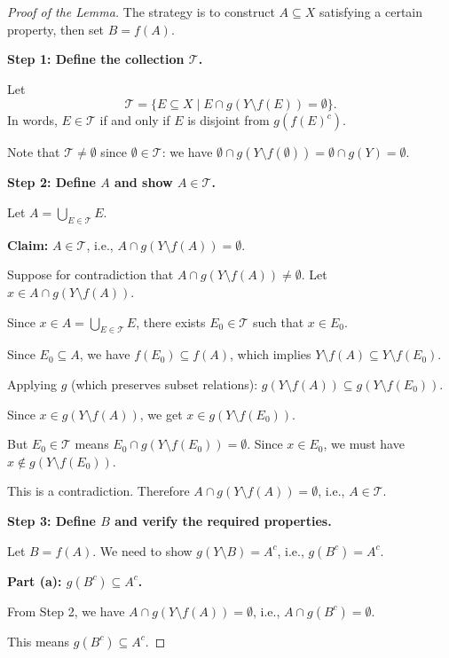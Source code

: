 \documentclass[11pt]{report}
\begin{document}
\begin{proof}[Proof of the Lemma]
The strategy is to construct $A \subseteq X$ satisfying a certain property, then set $B = f(A)$.

\textbf{Step 1: Define the collection $\mathcal{T}$.}

Let 
\[
\mathcal{T} = \{E \subseteq X \mid E \cap g(Y \setminus f(E)) = \emptyset\}.
\]
In words, $E \in \mathcal{T}$ if and only if $E$ is disjoint from $g(f(E)^c)$.

Note that $\mathcal{T} \neq \emptyset$ since $\emptyset \in \mathcal{T}$: we have $\emptyset \cap g(Y \setminus f(\emptyset)) = \emptyset \cap g(Y) = \emptyset$.

\textbf{Step 2: Define $A$ and show $A \in \mathcal{T}$.}

Let $A = \bigcup_{E \in \mathcal{T}} E$.

\textbf{Claim:} $A \in \mathcal{T}$, i.e., $A \cap g(Y \setminus f(A)) = \emptyset$.

Suppose for contradiction that $A \cap g(Y \setminus f(A)) \neq \emptyset$. Let $x \in A \cap g(Y \setminus f(A))$.

Since $x \in A = \bigcup_{E \in \mathcal{T}} E$, there exists $E_0 \in \mathcal{T}$ such that $x \in E_0$.

Since $E_0 \subseteq A$, we have $f(E_0) \subseteq f(A)$, which implies $Y \setminus f(A) \subseteq Y \setminus f(E_0)$.

Applying $g$ (which preserves subset relations): $g(Y \setminus f(A)) \subseteq g(Y \setminus f(E_0))$.

Since $x \in g(Y \setminus f(A))$, we get $x \in g(Y \setminus f(E_0))$.

But $E_0 \in \mathcal{T}$ means $E_0 \cap g(Y \setminus f(E_0)) = \emptyset$. Since $x \in E_0$, we must have $x \notin g(Y \setminus f(E_0))$.

This is a contradiction. Therefore $A \cap g(Y \setminus f(A)) = \emptyset$, i.e., $A \in \mathcal{T}$.

\textbf{Step 3: Define $B$ and verify the required properties.}

Let $B = f(A)$. We need to show $g(Y \setminus B) = A^c$, i.e., $g(B^c) = A^c$.

\textbf{Part (a): $g(B^c) \subseteq A^c$.}

From Step 2, we have $A \cap g(Y \setminus f(A)) = \emptyset$, i.e., $A \cap g(B^c) = \emptyset$.

This means $g(B^c) \subseteq A^c$.


\end{proof}
\end{document}
